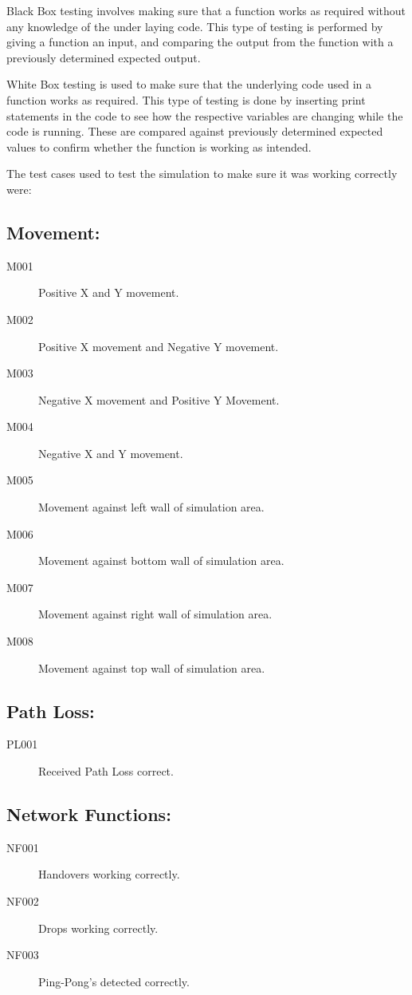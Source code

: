 Black Box testing involves making sure that a function works as required without any knowledge of the under laying code. This type of testing is performed by giving a function an input, and comparing the output from the function with a previously determined expected output.

White Box testing is used to make sure that the underlying code used in a function works as required. This type of testing is done by inserting print statements in the code to see how the respective variables are changing while the code is running. These are compared against previously determined expected values to confirm whether the function is working as intended.

The test cases used to test the simulation to make sure it was working correctly were: 
\subsection*{Movement:}
\begin{description}
\item[M001]	Positive X and Y movement.
\item[M002]	Positive X movement and Negative Y movement.
\item[M003]	Negative X movement and Positive Y Movement.
\item[M004]	Negative X and Y movement.
\item[M005]	Movement against left wall of simulation area.
\item[M006]	Movement against bottom wall of simulation area.
\item[M007]	Movement against right wall of simulation area.
\item[M008]	Movement against top wall of simulation area.
\end{description}
\subsection*{Path Loss:}
\begin{description}
\item[PL001]	Received Path Loss correct.
\end{description}
\subsection*{Network Functions:}
\begin{description}
\item[NF001]	Handovers working correctly.
\item[NF002]	Drops working correctly.
\item[NF003]	Ping-Pong's detected correctly.
\end{description}
